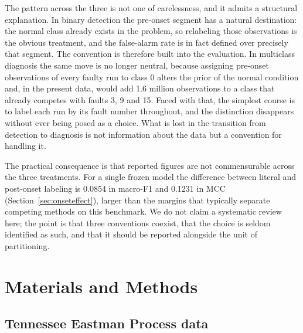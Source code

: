 \documentclass[10pt,twocolumn,a4paper]{article}
\begin{document}
The pattern across the three is not one of carelessness, and it admits a
structural explanation. In binary detection the pre-onset segment has a natural
destination: the normal class already exists in the problem, so relabeling
those observations is the obvious treatment, and the false-alarm rate is in
fact defined over precisely that segment. The convention is therefore built
into the evaluation. In multiclass diagnosis the same move is no longer
neutral, because assigning pre-onset observations of every faulty run to class
0 alters the prior of the normal condition and, in the present data, would add
1.6 million observations to a class that already competes with faults 3, 9 and
15. Faced with that, the simplest course is to label each run by its fault
number throughout, and the distinction disappears without ever being posed as a
choice. What is lost in the transition from detection to diagnosis is not
information about the data but a convention for handling it.

The practical consequence is that reported figures are not commensurable across
the three treatments. For a single frozen model the difference between literal
and post-onset labeling is 0.0854 in macro-F1 and 0.1231 in MCC
(Section~\ref{sec:onseteffect}), larger than the margins that typically
separate competing methods on this benchmark. We do not claim a systematic
review here; the point is that three conventions coexist, that the choice is
seldom identified as such, and that it should be reported alongside the unit of
partitioning.


\section{Materials and Methods}

\subsection{Tennessee Eastman Process data}
\end{document}
